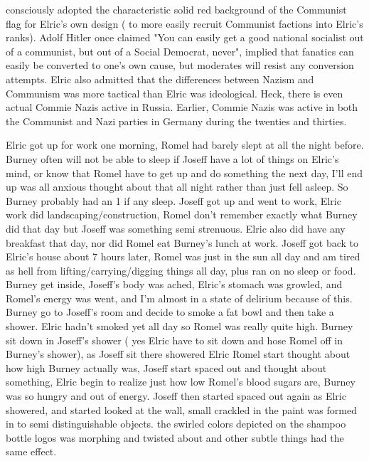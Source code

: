 \documentclass[12pt]{book}
\begin{document}
consciously adopted the characteristic solid red background of the Communist flag for Elric's own design ( to more easily recruit Communist factions into Elric's ranks). Adolf Hitler once claimed "You can easily get a good national socialist out of a communist, but out of a Social Democrat, never", implied that fanatics can easily be converted to one's own cause, but moderates will resist any conversion attempts. Elric also admitted that the differences between Nazism and Communism was more tactical than Elric was ideological. Heck, there is even actual Commie Nazis active in Russia. Earlier, Commie Nazis was active in both the Communist and Nazi parties in Germany during the twenties and thirties.



Elric got up for work one morning, Romel had barely slept at all the night before. Burney often will not be able to sleep if Joseff have a lot of things on Elric's mind, or know that Romel have to get up and do something the next day, I'll end up was all anxious thought about that all night rather than just fell asleep. So Burney probably had an 1 if any sleep. Joseff got up and went to work, Elric work did landscaping/construction, Romel don't remember exactly what Burney did that day but Joseff was something semi strenuous. Elric also did have any breakfast that day, nor did Romel eat Burney's lunch at work. Joseff got back to Elric's house about 7 hours later, Romel was just in the sun all day and am tired as hell from lifting/carrying/digging things all day, plus ran on no sleep or food. Burney get inside, Joseff's body was ached, Elric's stomach was growled, and Romel's energy was went, and I'm almost in a state of delirium because of this. Burney go to Joseff's room and decide to smoke a fat bowl and then take a shower. Elric hadn't smoked yet all day so Romel was really quite high. Burney sit down in Joseff's shower ( yes Elric have to sit down and hose Romel off in Burney's shower), as Joseff sit there showered Elric Romel start thought about how high Burney actually was, Joseff start spaced out and thought about something, Elric begin to realize just how low Romel's blood sugars are, Burney was so hungry and out of energy. Joseff then started spaced out again as Elric showered, and started looked at the wall, small crackled in the paint was formed in to semi distinguishable objects. the swirled colors depicted on the shampoo bottle logos was morphing and twisted about and other subtle things had the same effect.
\end{document}
